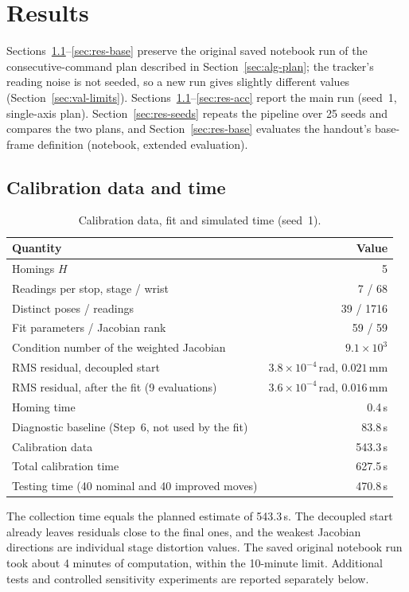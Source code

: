 \documentclass[../main.tex]{subfiles}
\begin{document}
\section{Results}\label{sec:results}
Sections~\ref{sec:res-cal}--\ref{sec:res-base} preserve the original saved notebook run of the consecutive-command plan described in Section~\ref{sec:alg-plan}; the tracker's reading noise is not seeded, so a new run gives slightly different values (Section~\ref{sec:val-limits}). Sections~\ref{sec:res-cal}--\ref{sec:res-acc} report the main run (seed~1, single-axis plan). Section~\ref{sec:res-seeds} repeats the pipeline over 25 seeds and compares the two plans, and Section~\ref{sec:res-base} evaluates the handout's base-frame definition (notebook, extended evaluation).

\subsection{Calibration data and time}\label{sec:res-cal}
\begin{table}[H]
\centering\small
\caption{Calibration data, fit and simulated time (seed~1).}\label{tab:res-cal}
\begin{tabular}{@{}lr@{}}
\toprule
Quantity & Value \\\midrule
Homings $H$ & 5 \\
Readings per stop, stage / wrist & 7 / 68 \\
Distinct poses / readings & 39 / 1716 \\
Fit parameters / Jacobian rank & 59 / 59 \\
Condition number of the weighted Jacobian & $9.1\times10^{3}$ \\
RMS residual, decoupled start & $3.8\times10^{-4}$\,rad, $0.021$\,mm \\
RMS residual, after the fit (9 evaluations) & $3.6\times10^{-4}$\,rad, $0.016$\,mm \\\midrule
Homing time & 0.4\,s \\
Diagnostic baseline (Step~6, not used by the fit) & 83.8\,s \\
Calibration data & 543.3\,s \\
Total calibration time & 627.5\,s \\
Testing time (40 nominal and 40 improved moves) & 470.8\,s \\
\bottomrule
\end{tabular}
\end{table}
The collection time equals the planned estimate of 543.3\,s. The decoupled start already leaves residuals close to the final ones, and the weakest Jacobian directions are individual stage distortion values. The saved original notebook run took about 4 minutes of computation, within the 10-minute limit. Additional tests and controlled sensitivity experiments are reported separately below.
\end{document}
